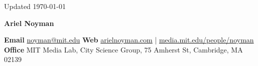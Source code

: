 \documentclass[8pt,letterpaper]{report}
\newcommand{\myname}{Ariel Noyman}
\newcommand{\namefont}[1]{{\lsstyle\Huge\bfseries{#1}}}
\begin{document}
\begin{center}
    \vfill
    \tiny {Updated \monthyeardate\today}
\end{center}
\vspace{3em}

\raggedright
\namefont{\myname}
\newline

\textbf{Email} \href{mailto:noyman@mit.edu}{noyman@mit.edu}
\newline
\textbf{Web} \href{http://www.arielnoyman.com/}{arielnoyman.com} | \href{https://www.media.mit.edu/people/noyman/overview/}{media.mit.edu/people/noyman}
\newline
\textbf{Office} MIT Media Lab, City Science Group, 75 Amherst St, Cambridge, MA 02139 













\end{document}

